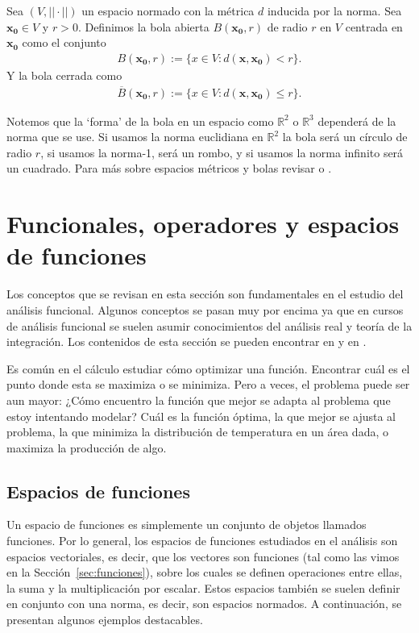 \documentclass[12pt]{book}
\begin{document}
\begin{definitionenv}
    Sea $(V,||\cdot||)$ un espacio normado con la métrica $d$ inducida por la norma. Sea $\mathbf{x_0}\in V$ y $r>0$. Definimos la bola abierta $B(\mathbf{x_0},r)$ de radio $r$ en $V$ centrada en $\mathbf{x_0}$ como el conjunto
    \begin{align*}
        B(\mathbf{x_0},r):=\{x\in V:d(\mathbf{x},\mathbf{x_0})<r\}.
    \end{align*}
    Y la bola cerrada como
    \begin{align*}
        \overline{B}(\mathbf{x_0},r):=\{x\in V:d(\mathbf{x},\mathbf{x_0})\leq r\}.
    \end{align*}
\end{definitionenv}

Notemos que la `forma' de la bola en un espacio como $\mathbb{R}^2$ o $\mathbb{R}^3$ dependerá de la norma que se use. Si usamos la norma euclidiana en $\mathbb{R}^2$ la bola será un círculo de radio $r$, si usamos la norma-1, será un rombo, y si usamos la norma infinito será un cuadrado. Para más sobre espacios métricos y bolas revisar \cite[Chapter 1]{Tao2016-qy} o \cite[Chapter 1]{kreyszig1991introductory}.

\section{Funcionales, operadores y espacios de funciones}
\noindent
Los conceptos que se revisan en esta sección son fundamentales en el estudio del análisis funcional. Algunos conceptos se pasan muy por encima ya que en cursos de análisis funcional se suelen asumir conocimientos del análisis real y teoría de la integración. Los contenidos de esta sección se pueden encontrar en \cite[Chapter 2, Section 2.2]{kreyszig1991introductory} y en \cite[Chapters 1,2,3]{Tao2016-qy}. 

Es común en el cálculo estudiar cómo optimizar una función. Encontrar cuál es el punto donde esta se maximiza o se minimiza. Pero a veces, el problema puede ser aun mayor: ¿Cómo encuentro la función que mejor se adapta al problema que estoy intentando modelar? Cuál es la función óptima, la que mejor se ajusta al problema, la que minimiza la distribución de temperatura en un área dada, o maximiza la producción de algo.

\subsection{Espacios de funciones}
\noindent
Un espacio de funciones es simplemente un conjunto de objetos llamados funciones. Por lo general, los espacios de funciones estudiados en el análisis son espacios vectoriales, es decir, que los vectores son funciones (tal como las vimos en la Sección~\ref{sec:funciones}), sobre los cuales se definen operaciones entre ellas, la suma y la multiplicación por escalar. Estos espacios también se suelen definir en conjunto con una norma, es decir, son espacios normados. A continuación, se presentan algunos ejemplos destacables.
\end{document}
